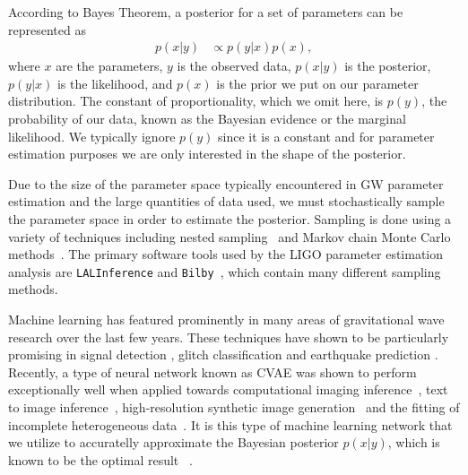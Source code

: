 \documentclass[%
showpacs,
 amsmath,amssymb,
 aps,
 twocolumn,
 prl,
 reprint,
floatfix,
]{revtex4-1}
\begin{document}
%
%
According to Bayes Theorem, a posterior for a set of parameters can be
represented as
%
\begin{align}\label{eq:bayes_theorem}
    p(x|y) &\propto p(y|x) p(x),
\end{align}
%
where $x$ are the parameters, $y$ is the observed data, $p(x|y)$ is the
posterior, $p(y|x)$ is the likelihood, and $p(x)$ is the prior we put on our
parameter distribution. The constant of proportionality, which we omit here, is
$p(y)$, the probability of our data, known as the Bayesian evidence or the
marginal likelihood. We typically ignore $p(y)$ since it is a constant and for
parameter estimation purposes we are only interested in the shape of the
posterior.

Due to the size of the parameter space typically encountered in \ac{GW}
parameter estimation and the large quantities of data used, we must
stochastically sample the parameter space in order to estimate the posterior.
Sampling is done using a variety of techniques including nested
sampling~\cite{cpnest,dynesty} and Markov chain Monte Carlo
methods~\cite{emcee,ptemcee}. The primary software tools used by the \ac{LIGO}
parameter estimation analysis are \texttt{LALInference} and
\texttt{Bilby}~\cite{1409.7215,1811.02042}, which contain many different
sampling methods.  
  
%
%
Machine learning has featured prominently in many areas of gravitational wave
research over the last few years. These techniques have shown to be
particularly promising in signal detection
\cite{GEORGE201864,PhysRevLett.120.141103,1904.08693}, glitch classification
\cite{1706.07446,0264-9381-34-6-064003} and earthquake prediction
\cite{Coughlin_2017}. Recently, a type of neural network known as \ac{CVAE} was
shown to perform exceptionally well when applied towards computational imaging
inference~\cite{1904.06264,NIPS2015_5775}, text to image
inference~\cite{1512.00570}, high-resolution synthetic image
generation~\cite{1612.00005} and the fitting of incomplete heterogeneous
data~\cite{1807.03653}. It is this type of machine learning network that we
utilize to accuratelly approximate the Bayesian posterior $p(x|y)$, which is
known to be the optimal result ~\cite{2009CQGra..26o5017S}.
\end{document}

